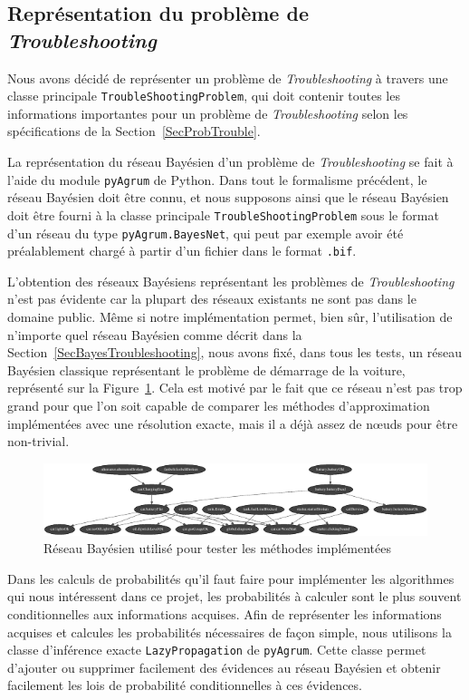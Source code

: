 \documentclass[a4paper,11pt]{article}
\theoremstyle{plain}
\theoremstyle{definition}
\begin{document}
\subsection{Représentation du problème de \emph{Troubleshooting}}
\label{SecImplRepresentation}

Nous avons décidé de représenter un problème de \emph{Troubleshooting} à travers une classe principale \texttt{TroubleShootingProblem}, qui doit contenir toutes les informations importantes pour un problème de \emph{Troubleshooting} selon les spécifications de la Section~\ref{SecProbTrouble}.

La représentation du réseau Bayésien d'un problème de \emph{Troubleshooting} se fait à l'aide du module \texttt{pyAgrum} de Python. Dans tout le formalisme précédent, le réseau Bayésien doit être connu, et nous supposons ainsi que le réseau Bayésien doit être fourni à la classe principale \texttt{TroubleShootingProblem} sous le format d'un réseau du type \texttt{pyAgrum.BayesNet}, qui peut par exemple avoir été préalablement chargé à partir d'un fichier dans le format \texttt{.bif}.

L'obtention des réseaux Bayésiens représentant les problèmes de \emph{Troubleshooting} n'est pas évidente car la plupart des réseaux existants ne sont pas dans le domaine public. Même si notre implémentation permet, bien sûr, l'utilisation de n'importe quel réseau Bayésien comme décrit dans la Section~\ref{SecBayesTroubleshooting}, nous avons fixé, dans tous les tests, un réseau Bayésien classique représentant le problème de démarrage de la voiture, représenté sur la Figure~\ref{FigReseauBayes}. Cela est motivé par le fait que ce réseau n'est pas trop grand pour que l'on soit capable de comparer les méthodes d'approximation implémentées avec une résolution exacte, mais il a déjà assez de nœuds pour être non-trivial.

\begin{figure}[ht]
\centering
\includegraphics[width=\textwidth]{Figures/simpleCar2.pdf}
\caption{Réseau Bayésien utilisé pour tester les méthodes implémentées}
\label{FigReseauBayes}
\end{figure}

Dans les calculs de probabilités qu'il faut faire pour implémenter les algorithmes qui nous intéressent dans ce projet, les probabilités à calculer sont le plus souvent conditionnelles aux informations acquises. Afin de représenter les informations acquises et calcules les probabilités nécessaires de façon simple, nous utilisons la classe d'inférence exacte \texttt{LazyPropagation} de \texttt{pyAgrum}. Cette classe permet d'ajouter ou supprimer facilement des évidences au réseau Bayésien et obtenir facilement les lois de probabilité conditionnelles à ces évidences.
\end{document}
